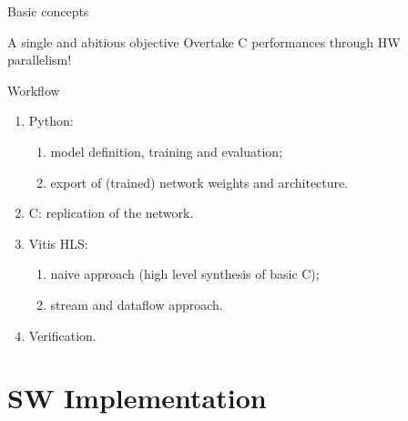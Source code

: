 \documentclass[xcolor=table]{beamer}
\begin{document}
\begin{frame}{Basic concepts}
  \begin{block}{A single and abitious objective}
    Overtake C performances through HW parallelism!
  \end{block}
  \begin{block}{Workflow}
    \begin{enumerate}
      \item
        Python:
        \begin{enumerate}
          \item
            model definition, training and evaluation;
          \item
            export of (trained) network weights and architecture.
        \end{enumerate}
      \item
        C: replication of the network.
      \item
        Vitis HLS:
        \begin{enumerate}
          \item
            naive approach (high level synthesis of basic C);
          \item
            stream and dataflow approach.
        \end{enumerate}
      \item
        Verification.
    \end{enumerate}
  \end{block}
\end{frame}

\section{SW Implementation}
\end{document}
